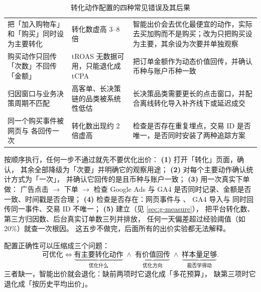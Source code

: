 \begin{table}[htbp]
\centering
\caption{转化动作配置的四种常见错误及其后果}
\label{tab:g-conv-config}
\small
\begin{tabularx}{\textwidth}{L{3.1cm} L{3.5cm} Y}
\toprule
{} &  &  \\
\midrule
把「加入购物车」和「购买」同时设为主要转化 & 转化数虚高 3--8 倍 & 智能出价会去优化最便宜的动作，实际去买加购而不是购买；改为只把购买设为主要，其余设为次要并单独观察 \\
\addlinespace
购买动作只回传「次数」不回传「金额」 & tROAS 无数据可用，只能退化成 tCPA & 把订单金额作为动态价值回传，并确认币种与账户币种一致 \\
\addlinespace
归因窗口与业务决策周期不匹配 & 高客单、长决策链的品类被系统性低估 & 长决策品类需要更长的点击窗口，并配合离线转化导入补齐线下或延迟成交 \\
\addlinespace
同一个购买事件被网页与  各回传一次 & 转化数出现约 2 倍虚高 & 检查是否存在重复埋点，交易 ID 是否唯一，是否同时安装了两种追踪方案 \\
\bottomrule
\end{tabularx}
\end{table}

\begin{toolbox}
按顺序执行，任何一步不通过就先不要优化出价：
\textbf{(1)} 打开「转化」页面，确认，
其余全部降级为「次要」并明确它的观察用途；
\textbf{(2)} 对每个主要动作确认统计方式为「一次」，
并确认它回传的是且币种与账户一致；
\textbf{(3)} 用一次真实下单做：
广告点击 $\to$ 下单 $\to$ 检查 Google Ads 与 GA4 是否同时记录、金额是否一致、时间戳是否合理；
\textbf{(4)} 检查是否存在：网页事件与 、
GA4 导入与  同时回传同一事件、交易 ID 不唯一；
\textbf{(5)} 建立（见 \cref{sec:g-measure}），
把平台转化数、第三方归因数、后台真实订单数三列并排放，
任何一天偏差超过经验阈值（如 20\%）就查一次根因。
这五步不做完，后面所有的出价实验都无法解释。
\end{toolbox}

\begin{formulacard}[转化目标配置速记]
配置正确性可以压缩成三个问题：
\begin{equation}
\text{可优化} \iff \underbrace{\text{有主要转化动作}}_{\text{优化什么}}
\;\wedge\; \underbrace{\text{有价值回传}}_{\text{优化方向}}
\;\wedge\; \underbrace{\text{样本量足够}}_{\text{能否学得动}} .
\label{eq:g-opt-cond}
\end{equation}
三者缺一，智能出价就会退化：缺前两项时它退化成「多花预算」，
缺第三项时它退化成「按历史平均出价」。
\end{formulacard}

